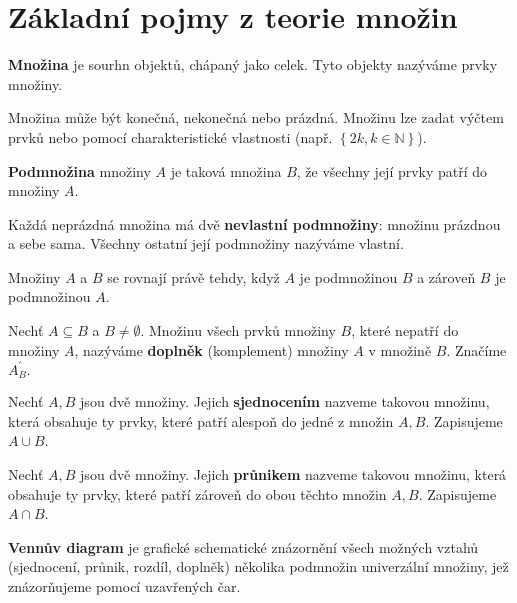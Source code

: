 \section{Základní pojmy z teorie množin}
\begin{definition}
  \textbf{Množina} je sourhn objektů, chápaný jako celek. Tyto objekty nazýváme prvky množiny.
\end{definition}

Množina může být konečná, nekonečná nebo prázdná. Množinu lze zadat výčtem prvků nebo pomocí charakteristické vlastnosti (např. $\left \{ 2k, k \in \mathbb{N}\right\}$).

\begin{definition}
  \textbf{Podmnožina} množiny $A$ je taková množina $B$, že všechny její prvky patří do množiny $A$.
\end{definition}

Každá neprázdná množina má dvě \textbf{nevlastní podmnožiny}: množinu prázdnou a sebe sama. Všechny ostatní její podmnožiny nazýváme vlastní.

\begin{definition}
  Množiny $A$ a $B$ se rovnají právě tehdy, když $A$ je podmnožinou $B$ a zároveň $B$ je podmnožinou $A$.
\end{definition}

\begin{definition}
  Nechť $A \subseteq B$ a $B\neq \emptyset$. Množinu všech prvků množiny $B$, které nepatří do množiny $A$, nazýváme \textbf{doplněk} (komplement) množiny $A$ v množině $B$. Značíme $A_B^\prime.$
\end{definition}

\begin{definition}
  Nechť $A, B$ jsou dvě množiny. Jejich \textbf{sjednocením} nazveme takovou množinu, která obsahuje ty prvky, které patří alespoň do jedné z množin $A, B$. Zapisujeme $A \cup B$.
\end{definition}

\begin{definition}
  Nechť $A, B$ jsou dvě množiny. Jejich \textbf{průnikem} nazveme takovou množinu, která obsahuje ty prvky, které patří zároveň do obou těchto množin $A, B$. Zapisujeme $A \cap B$.
\end{definition}

\begin{definition}
  \textbf{Vennův diagram} je grafické schematické znázornění všech možných vztahů (sjednocení, průnik, rozdíl, doplněk) několika podmnožin univerzální množiny, jež znázorňujeme pomocí uzavřených čar.
\end{definition}

